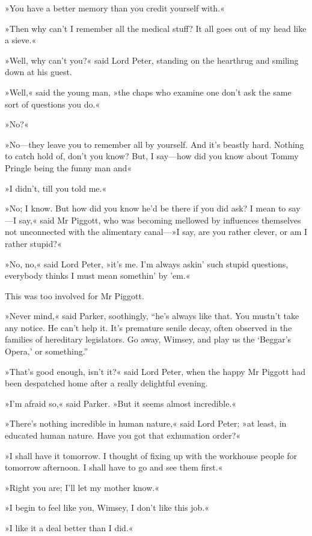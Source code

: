 »You have a better memory than you credit yourself with.«

»Then why can't I remember all the medical stuff? It all goes out of my head like a sieve.«

»Well, why can't you?« said Lord Peter, standing on the hearthrug and smiling down at his guest.

»Well,« said the young man, »the chaps who examine one don't ask the same sort of questions you do.«

»No?«

»No—they leave you to remember all by yourself. And it's beastly hard. Nothing to catch hold of, don't you know? But, I say—how did you know about Tommy Pringle being the funny man and\longdash«

»I didn't, till you told me.«

»No; I know. But how did you know he'd be there if you did ask? I mean to say—I say,« said Mr Piggott, who was becoming mellowed by influences themselves not unconnected with the alimentary canal---»I say, are you rather clever, or am I rather stupid?«

»No, no,« said Lord Peter, »it's me. I'm always askin' such stupid questions, everybody thinks I must mean somethin' by 'em.«

This was too involved for Mr Piggott.

»Never mind,« said Parker, soothingly, “he's always like that. You mustn't take any notice. He can't help it. It's premature senile decay, often observed in the families of hereditary legislators. Go away, Wimsey, and play us the ‘Beggar's Opera,' or something.”

»That's good enough, isn't it?« said Lord Peter, when the happy Mr Piggott had been despatched home after a really delightful evening.

»I'm afraid so,« said Parker. »But it seems almost incredible.«

»There's nothing incredible in human nature,« said Lord Peter; »at least, in educated human nature. Have you got that exhumation order?«

»I shall have it tomorrow. I thought of fixing up with the workhouse people for tomorrow afternoon. I shall have to go and see them first.«

»Right you are; I'll let my mother know.«

»I begin to feel like you, Wimsey, I don't like this job.«

»I like it a deal better than I did.«

